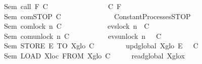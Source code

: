 \begin{isabellebody}
\ \ \ \ \ \ \ {\isacharbar}{\kern0pt}{\isachardoublequoteopen}Sem\ {\isacharparenleft}{\kern0pt}call\ F{\isacharparenright}{\kern0pt}\ C\ \ \ \ \ \ \ \ \ \ \ \ \ \ {\isacharequal}{\kern0pt}\ {\isacharparenleft}{\kern0pt}{\isasymlambda}\ {\isasymsigma}{\isachardot}{\kern0pt}\ C\ {\isacharparenleft}{\kern0pt}F\ {\isasymsigma}{\isacharparenright}{\kern0pt}{\isacharparenright}{\kern0pt}{\isachardoublequoteclose}\isanewline
\ \ \ \ \ \ \ {\isacharbar}{\kern0pt}{\isachardoublequoteopen}Sem\ {\isacharparenleft}{\kern0pt}com{\isachardot}{\kern0pt}STOP{\isacharparenright}{\kern0pt}\ C\ \ \ \ \ \ \ \ \ \ \ \ {\isacharequal}{\kern0pt}\ {\isacharparenleft}{\kern0pt}{\isasymlambda}\ {\isasymsigma}{\isachardot}{\kern0pt}\ Constant{\isacharunderscore}{\kern0pt}Processes{\isachardot}{\kern0pt}STOP{\isacharparenright}{\kern0pt}{\isachardoublequoteclose}\isanewline
\ \ \ \ \ \ \ {\isacharbar}{\kern0pt}{\isachardoublequoteopen}Sem\ {\isacharparenleft}{\kern0pt}com{\isachardot}{\kern0pt}lock\ n{\isacharparenright}{\kern0pt}\ C\ \ \ \ \ \ \ \ \ \ {\isacharequal}{\kern0pt}\ {\isacharparenleft}{\kern0pt}{\isasymlambda}\ {\isasymsigma}{\isachardot}{\kern0pt}\ evs{\isachardot}{\kern0pt}lock\ n\ {\isasymrightarrow}\ C\ {\isasymsigma}{\isacharparenright}{\kern0pt}{\isachardoublequoteclose}\isanewline
\ \ \ \ \ \ \ {\isacharbar}{\kern0pt}{\isachardoublequoteopen}Sem\ {\isacharparenleft}{\kern0pt}com{\isachardot}{\kern0pt}unlock\ n{\isacharparenright}{\kern0pt}\ C\ \ \ \ \ \ \ \ {\isacharequal}{\kern0pt}\ {\isacharparenleft}{\kern0pt}{\isasymlambda}\ {\isasymsigma}{\isachardot}{\kern0pt}\ evs{\isachardot}{\kern0pt}unlock\ n\ \ {\isasymrightarrow}\ C\ {\isasymsigma}{\isacharparenright}{\kern0pt}{\isachardoublequoteclose}\isanewline
\ \ \ \ \ \ \ {\isacharbar}{\kern0pt}{\isachardoublequoteopen}Sem\ {\isacharparenleft}{\kern0pt}STORE\ E\ TO\ X\isactrlsub g\isactrlsub l\isactrlsub o{\isacharparenright}{\kern0pt}\ C\ \ \ \ \ \ {\isacharequal}{\kern0pt}\ {\isacharparenleft}{\kern0pt}{\isasymlambda}\ {\isasymsigma}{\isachardot}{\kern0pt}\ upd\isactrlsub g\isactrlsub l\isactrlsub o\isactrlsub b\isactrlsub a\isactrlsub l\ X\isactrlsub g\isactrlsub l\isactrlsub o\ {\isacharparenleft}{\kern0pt}E\ {\isasymsigma}{\isacharparenright}{\kern0pt}\ {\isasymrightarrow}\ C\ {\isasymsigma}{\isacharparenright}{\kern0pt}{\isachardoublequoteclose}\isanewline
\ \ \ \ \ \ \ {\isacharbar}{\kern0pt}{\isachardoublequoteopen}Sem\ {\isacharparenleft}{\kern0pt}LOAD\ X\isactrlsub l\isactrlsub o\isactrlsub c\ FROM\ X\isactrlsub g\isactrlsub l\isactrlsub o{\isacharparenright}{\kern0pt}\ C\ \ \ {\isacharequal}{\kern0pt}\ {\isacharparenleft}{\kern0pt}{\isasymlambda}\ {\isasymsigma}{\isachardot}{\kern0pt}\ {\isacharparenleft}{\kern0pt}read\isactrlsub g\isactrlsub l\isactrlsub o\isactrlsub b\isactrlsub a\isactrlsub l\ X\isactrlsub g\isactrlsub l\isactrlsub o{\isacharparenright}{\kern0pt}\isactrlbold {\isacharquery}{\kern0pt}x\ \isanewline

\end{isabellebody}
